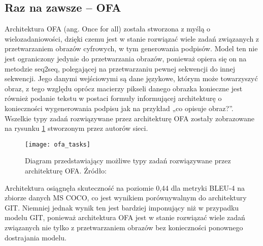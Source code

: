 \subsection{Raz na zawsze -- OFA}
Architektura OFA \cite{wang2022ofa} (ang. Once for all) została stworzona z myślą o wielozadaniowości, dzięki czemu jest w stanie rozwiązać wiele zadań związanych z przetwarzaniem obrazów cyfrowych, w tym generowania podpisów. Model ten nie jest ograniczony jedynie do przetwarzania obrazów, ponieważ opiera się on na metodzie seq2seq, polegającej na przetwarzaniu pewnej sekwencji do innej sekwencji. Jego danymi wejściowymi są dane językowe, którym może towarzyszyć obraz, z tego względu oprócz macierzy pikseli danego obrazka konieczne jest również podanie tekstu w postaci formuły informującej architekturę o konieczności wygenerowania podpisu jak na przykład „co opisuje obraz?”. Wszelkie typy zadań rozwiązywane przez architekturę OFA zostały zobrazowane na rysunku \ref{fig:ofa-tasks} stworzonym przez autorów sieci.
\begin{figure}[H]
  \centering
  \texttt{[image: ofa\_tasks]}
  \caption{Diagram przedstawiający możliwe typy zadań rozwiązywane przez architekturę OFA. Źródło: \cite{wang2022ofa}}
  \label{fig:ofa-tasks}
\end{figure}
\noindent Architektura osiągnęła skuteczność na poziomie 0,44 dla metryki BLEU-4 na zbiorze danych MS COCO, co jest wynikiem porównywalnym do architektury GIT. Niemniej jednak wynik ten jest bardziej imponujący niż w przypadku modelu GIT, ponieważ architektura OFA jest w stanie rozwiązać wiele zadań związanych nie tylko z przetwarzaniem obrazów bez konieczności ponownego dostrajania modelu.

